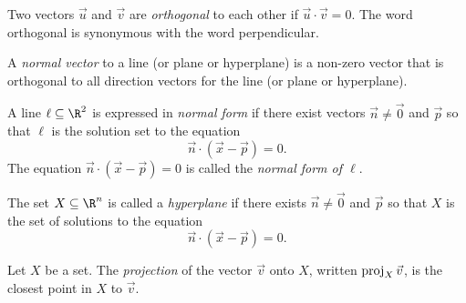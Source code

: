 \begin{SaveDefinition}[key=Orthogonal, title={Orthogonal}]
	Two vectors $\vec u$ and $\vec v$ are
	\emph{orthogonal} to each other if $\vec u\cdot \vec v=0$. The word orthogonal
	is synonymous with the word perpendicular.
\end{SaveDefinition}

\begin{SaveDefinition}[key=NormalVector, title={Normal Vector}]
	A
	\emph{normal vector} to a line (or plane or hyperplane) is a non-zero
	vector that is orthogonal to all direction vectors for the line (or plane
	or hyperplane).
\end{SaveDefinition}

\begin{SaveDefinition}[key=NormalFormofaLine, title={Normal Form of a Line}]

	A line $\ell\subseteq \R^2$ is expressed in \emph{normal form} if there exist
	vectors $\vec n\neq \vec 0$ and $\vec p$ so that $\ell$ is the solution set to the equation
	\[
		\vec n\cdot (\vec x-\vec p)=0.
	\]
	The equation $\vec n\cdot (\vec x-\vec p)=0$ is called the \emph{normal form of $\ell$}.
\end{SaveDefinition}

\begin{SaveDefinition}[key=Hyperplane, title={Hyperplane}]
	The set $X\subseteq \R^n$ is called a \emph{hyperplane} if there
	exists $\vec n\neq \vec 0$ and $\vec p$ so that $X$ is the set of solutions
	to the equation
	\[
		\vec n\cdot (\vec x-\vec p)=0.
	\]
\end{SaveDefinition}


\begin{SaveDefinition}[key=Projection, title={Projection}]
	Let $X$ be a set. The
	\emph{projection} of the vector $\vec v$ onto $X$, written $\operatorname{proj}_{X}\vec
	v$, is the closest point in $X$ to $\vec v$.
\end{SaveDefinition}

